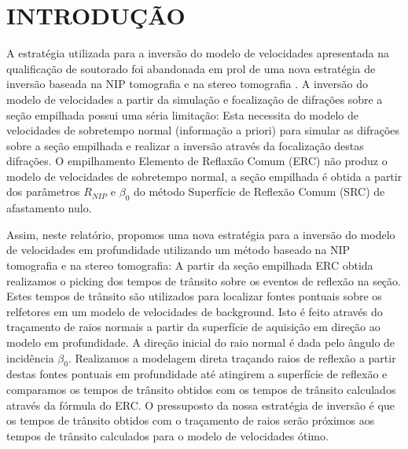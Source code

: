 \chapter{INTRODUÇÃO}
\label{cap1}

A estratégia utilizada para a inversão do modelo de velocidades apresentada na
qualificação de soutorado \cite{relatorio} foi abandonada em prol de uma nova estratégia de
inversão baseada na NIP tomografia e na stereo tomografia \cite{niptomo,stereo}.
A inversão do modelo de velocidades a partir da simulação e focalização
de difrações sobre a seção empilhada \cite{relatorio}  
possui uma séria limitação: Esta necessita do modelo de velocidades
de sobretempo normal (informação a priori) para simular as difrações sobre a seção empilhada e realizar a inversão através da focalização destas difrações. O empilhamento Elemento de Reflaxão Comum (ERC)
não produz o modelo de velocidades de sobretempo normal,
a seção empilhada é obtida a partir dos parâmetros $R_{NIP}$ e $\beta_0$ do método 
Superfície de Reflexão Comum (SRC) de afastamento nulo.

Assim, neste relatório, propomos uma nova estratégia para a inversão do modelo de velocidades em
profundidade utilizando um método baseado na NIP tomografia e na stereo tomografia: A partir da seção
empilhada ERC obtida \cite{relatorio} realizamos o picking dos tempos de trânsito sobre os eventos de
reflexão na seção. Estes tempos de trânsito são utilizados para localizar fontes pontuais sobre os relfetores
em um modelo de velocidades de background. Isto é feito através do traçamento de raios normais a partir
da superfície de aquisição em direção ao modelo em profundidade. A direção inicial do raio normal
é dada pelo ângulo de incidência $\beta_0$.
Realizamos a modelagem direta traçando raios de reflexão a partir destas fontes pontuais em profundidade
até atingirem a superfície de reflexão e comparamos os tempos de trânsito obtidos com os tempos de trânsito
calculados através da fórmula do ERC. O pressuposto da nossa estratégia de inversão é que os tempos
de trânsito obtidos com o traçamento de raios serão próximos aos tempos de trânsito calculados para
o modelo de velocidades ótimo.




